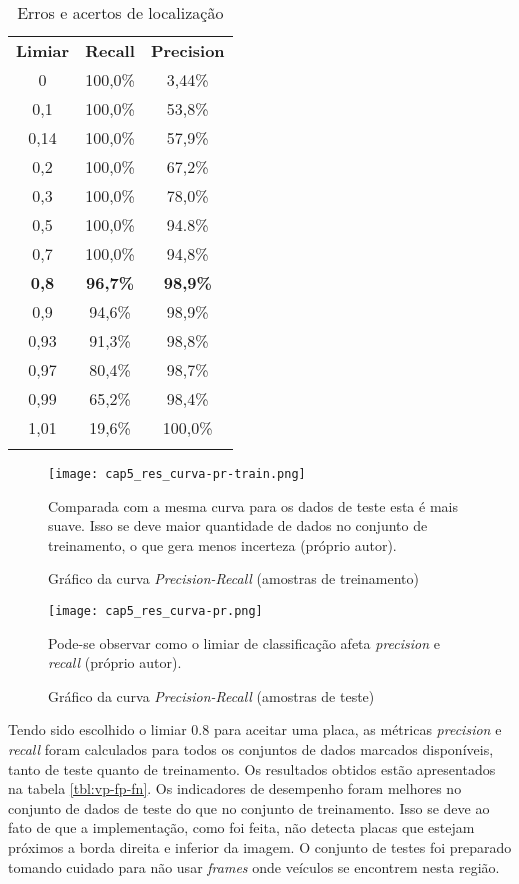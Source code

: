 \begin{table}
	\center
	\caption{Erros e acertos de localização}
	\renewcommand{\arraystretch}{1.6}
	\begin{tabular}{ccc}
		\Xhline{6\arrayrulewidth}
		\textbf{Limiar} &
			\textbf{Recall} &
			\textbf{Precision} \\
		\Xhline{2\arrayrulewidth}
			0    & 100,0\%  &  3,44\% \\
			0,1  & 100,0\%  &  53,8\% \\
			0,14 & 100,0\%  &  57,9\% \\
			0,2  & 100,0\%  &  67,2\% \\
			0,3  & 100,0\%  &  78,0\% \\
			0,5  & 100,0\%  &  94.8\% \\
			0,7  & 100,0\%  &  94,8\% \\
			\textbf{0,8}  &  \textbf{96,7\%}  &  \textbf{98,9\%} \\
			0,9  &  94,6\%  &  98,9\% \\
			0,93 &  91,3\%  &  98,8\% \\
			0,97 &  80,4\%  &  98,7\% \\
			0,99 &  65,2\%  &  98,4\% \\
			1,01 &  19,6\%  & 100,0\% \\
		\Xhline{6\arrayrulewidth}
	\end{tabular}
	\label{tbl:curva-pr}
\end{table}

\begin{figure}[!htb]
	\centering
	\texttt{[image: cap5\_res\_curva-pr-train.png]}
	\caption{Gráfico da curva \emph{Precision-Recall}
		(amostras de treinamento)}
	\label{fig:cap5_res_curva-pr-train}
	Comparada com a mesma curva para os dados de teste esta é mais suave. Isso
	se deve maior quantidade de dados no conjunto de treinamento, o que gera
	menos incerteza (próprio autor).
\end{figure}

\begin{figure}[!htb]
	\centering
	\texttt{[image: cap5\_res\_curva-pr.png]}
	\caption{Gráfico da curva \emph{Precision-Recall} (amostras de teste)}
	\label{fig:cap5_res_curva-pr}
	Pode-se observar como o limiar de classificação afeta \emph{precision} e
	\emph{recall} (próprio autor).
\end{figure}

Tendo sido escolhido o limiar 0.8 para aceitar uma placa, as métricas
\emph{precision} e \emph{recall} foram calculados para todos os conjuntos
de dados marcados disponíveis, tanto de teste quanto de treinamento.
Os resultados obtidos estão apresentados na tabela
\ref{tbl:vp-fp-fn}. Os indicadores de desempenho foram melhores no
conjunto de dados de teste do que no conjunto de treinamento. Isso
se deve ao fato de que a implementação, como foi feita, não detecta
placas que estejam próximos a borda direita e
inferior da imagem. O conjunto de testes foi preparado tomando cuidado
para não usar \emph{frames} onde veículos se encontrem nesta região.

